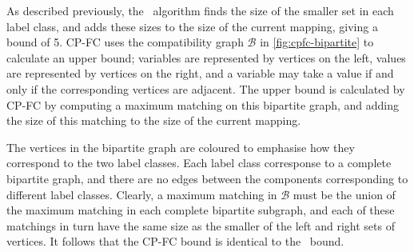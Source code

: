 \documentclass[letterpaper]{article}
\newcommand{\McSplit}{\textproc{McSplit}}
\newcommand{\graphB}{\mathcal{B}}
\begin{document}
As described previously, the \McSplit\ algorithm finds the size of the smaller
set in each label class, and adds these sizes to the size of the current
mapping, giving a bound of 5.  CP-FC uses the compatibility graph $\graphB$ in
\cref{fig:cpfc-bipartite} to calculate an upper bound; variables are
represented by vertices on the left, values are represented by vertices on the
right, and a variable may take a value if and only if the corresponding
vertices are adjacent.  The upper bound is calculated by CP-FC by computing a
maximum matching on this bipartite graph, and adding the size of this matching
to the size of the current mapping.

The vertices in the bipartite graph are coloured to emphasise how they
correspond to the two label classes.  Each label class corresponse to a
complete bipartite graph, and there are no edges between the components
corresponding to different label classes.  Clearly, a maximum matching in
$\graphB$ must be the union of the maximum matching in each complete bipartite
subgraph, and each of these matchings in turn have the same size as the smaller
of the left and right sets of vertices.  It follows that the CP-FC bound is
identical to the \McSplit\ bound.
\end{document}

